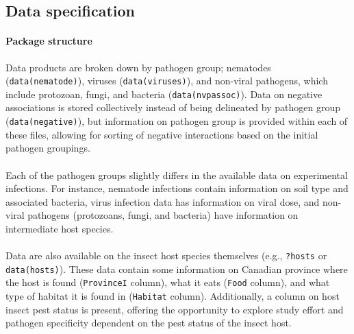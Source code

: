 \documentclass[12pt]{article}
\begin{document}
\subsection*{Data specification}



\paragraph*{Package structure}

Data products are broken down by pathogen group; nematodes (\texttt{data(nematode)}), viruses (\texttt{data(viruses)}), and non-viral pathogens, which include protozoan, fungi, and bacteria (\texttt{data(nvpassoc)}). Data on negative associations is stored collectively instead of being delineated by pathogen group (\texttt{data(negative)}), but information on pathogen group is provided within each of these files, allowing for sorting of negative interactions based on the initial pathogen groupings. 


\paragraph*{}
Each of the pathogen groups slightly differs in the available data on experimental infections. For instance, nematode infections contain information on soil type and associated bacteria, virus infection data has information on viral dose, and non-viral pathogens (protozoans, fungi, and bacteria) have information on intermediate host species.


\paragraph*{}
Data are also available on the insect host species themselves (e.g., \texttt{?hosts} or \texttt{data(hosts)}). These data contain some information on Canadian province where the host is found (\texttt{ProvinceI} column), what it eats (\texttt{Food} column), and what type of habitat it is found in (\texttt{Habitat} column). Additionally, a column on host insect pest status is present, offering the opportunity to explore study effort and pathogen specificity dependent on the pest status of the insect host. 
\end{document}
